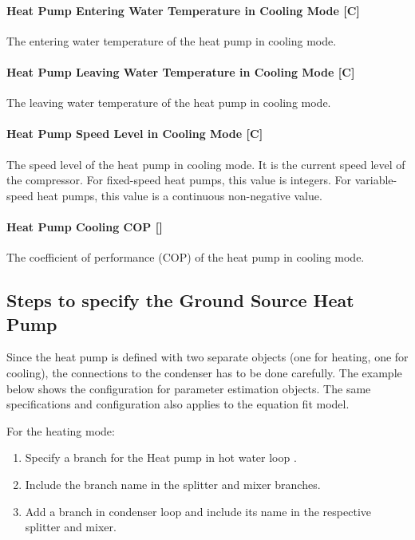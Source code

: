 \paragraph{Heat Pump Entering Water Temperature in Cooling Mode {[}C{]}} The
entering water temperature of the heat pump in cooling mode.
\paragraph{Heat Pump Leaving Water Temperature in Cooling Mode {[}C{]}} The
leaving water temperature of the heat pump in cooling mode.
\paragraph{Heat Pump Speed Level in Cooling Mode {[}C{]}} The speed level of the
heat pump in cooling mode. It is the current speed level of the compressor. For
fixed-speed heat pumps, this value is integers. For variable-speed heat pumps,
this value is a continuous non-negative value.
\paragraph{Heat Pump Cooling COP {[}{]}} The coefficient of performance (COP) of
the heat pump in cooling mode.

\subsection{Steps to specify the Ground Source Heat Pump}\label{steps-to-specify-the-ground-source-heat-pump}

Since the heat pump is defined with two separate objects (one for heating, one for cooling), the connections to the condenser has to be done carefully. The example below shows the configuration for parameter estimation objects. The same specifications and configuration also applies to the equation fit model.

For the heating mode:

\begin{enumerate}
    \def\labelenumi{\arabic{enumi}.}
    \item
    Specify a branch for the Heat pump in hot water loop .
    \item
    Include the branch name in the splitter and mixer branches.
    \item
    Add a branch in condenser loop and include its name in the respective splitter and mixer.
\end{enumerate}

